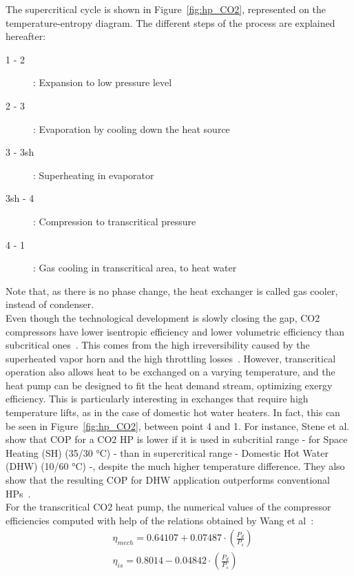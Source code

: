\documentclass{article}
\begin{document}
The supercritical cycle is shown in Figure~\ref{fig:hp_CO2}, represented on the temperature-entropy diagram. The different steps of the process are explained hereafter: 
\begin{description}
\item [1 - 2]: Expansion to low pressure level
\item [2 - 3]: Evaporation by cooling down the heat source
\item [3 - 3sh]: Superheating in evaporator
\item [3sh - 4]: Compression to transcritical pressure
\item [4 - 1]: Gas cooling in transcritical area, to heat water
\end{description}
Note that, as there is no phase change, the heat exchanger is called gas cooler, instead of condenser.\\

Even though the technological development is slowly closing the gap, CO2 compressors have lower isentropic efficiency and lower volumetric efficiency than subcritical ones~\cite{sarkarSimulationTranscriticalCO22006}. This comes from the high irreversibility caused by the superheated vapor horn and the high throttling losses~\cite{yangTheoreticalExperimentalInvestigation2016}. 
However, transcritical operation also allows heat to be exchanged on a varying temperature, and the heat pump can be designed to fit the heat demand stream, optimizing exergy efficiency. This is particularly interesting in exchanges that require high temperature lifts, as in the case of domestic hot water heaters. In fact, this can be seen in Figure~\ref{fig:hp_CO2}, between point 4 and 1.  For instance, Stene et al. show that COP for a CO2 HP is lower if it is used in subcritial range - for Space Heating (SH) (35/30 \si{\celsius}) - than in supercritical range - Domestic Hot Water (DHW) (10/60 \si{\celsius}) -, despite the much higher temperature difference. They also show that the resulting COP for DHW application outperforms conventional HPs~\cite{steneINTEGRATEDCO2HEAT2007}.\\

For the transcritical CO2 heat pump, the numerical values of the compressor efficiencies computed with help of the relations obtained by Wang et al~\cite{wangExperimentalInvestigationAirsource2013}:
\begin{align}
	& \eta_{mech} = 0.64107+0.07487\cdot(\frac{P_{d}}{P_{s}})\\
	& \eta_{is} = 0.8014-0.04842\cdot(\frac{P_{d}}{P_{s}})\\
\end{align}
\end{document}
